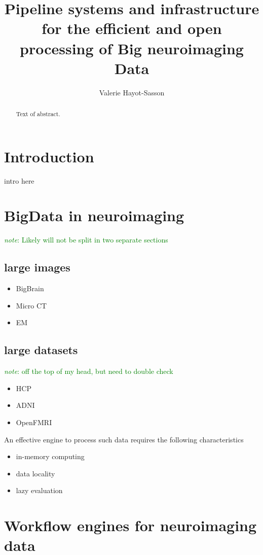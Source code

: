 \documentclass{report}
\newcommand{\note}[1]{\textcolor{green}{\textit{note}: #1}}
\begin{document}
\title{Pipeline systems and infrastructure for the efficient and open processing of Big neuroimaging Data}
\author{Valerie Hayot-Sasson}
\maketitle
\begin{abstract}
  Text of abstract.  
\end{abstract}
\tableofcontents
\chapter{Introduction}
intro here
\chapter{BigData in neuroimaging}
    \note{Likely will not be split in two separate sections}
    \section{large images}
        \begin{itemize}  
            \item BigBrain
            \item Micro CT 
            \item EM 
        \end{itemize}
    \section{large datasets}
    	\note{off the top of my head, but need to double check}
        \begin{itemize}
            \item HCP
            \item ADNI
            \item OpenFMRI
        \end{itemize}
    An effective engine to process such data requires the following characteristics
        \begin{itemize}
            \item in-memory computing
            \item data locality
            \item lazy evaluation
        \end{itemize}
\chapter{Workflow engines for neuroimaging data}
\end{document}
